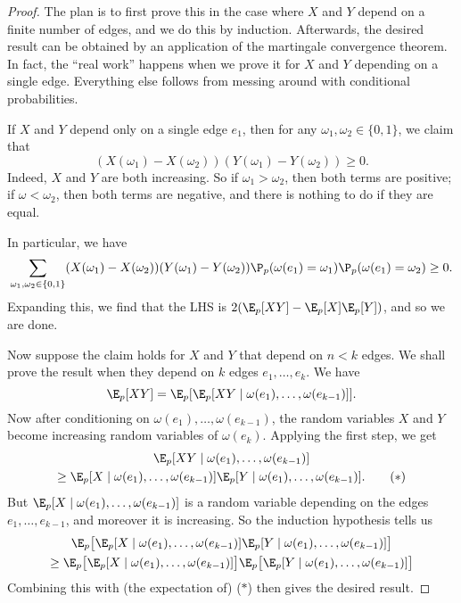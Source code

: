 \documentclass[a4paper]{article}
\begin{document}
\begin{proof}
  The plan is to first prove this in the case where $X$ and $Y$ depend on a finite number of edges, and we do this by induction. Afterwards, the desired result can be obtained by an application of the martingale convergence theorem. In fact, the ``real work'' happens when we prove it for $X$ and $Y$ depending on a single edge. Everything else follows from messing around with conditional probabilities.

  If $X$ and $Y$ depend only on a single edge $e_1$, then for any $\omega_1, \omega_2 \in \{0, 1\}$, we claim that
  \[
    (X(\omega_1) - X(\omega_2))(Y(\omega_1) - Y(\omega_2)) \geq 0.
  \]
  Indeed, $X$ and $Y$ are both increasing. So if $\omega_1 > \omega_2$, then both terms are positive; if $\omega < \omega_2$, then both terms are negative, and there is nothing to do if they are equal.

  In particular, we have
  \[
    \sum_{\omega_1, \omega_2 \in \{0, 1\}} (X(\omega_1) - X(\omega_2)) (Y(\omega_1) - Y(\omega_2)) \P_p( \omega(e_1) = \omega_1) \P_p(\omega(e_1) = \omega_2) \geq 0.
  \]
  Expanding this, we find that the LHS is $2(\E_p[XY] - \E_p[X] \E_p[Y])$, and so we are done.

  Now suppose the claim holds for $X$ and $Y$ that depend on $n < k$ edges. We shall prove the result when they depend on $k$ edges $e_1, \ldots, e_k$. We have
  \[
    \E_p[XY] = \E_p[\E_p[XY \mid \omega(e_1), \ldots, \omega(e_{k - 1})]].
  \]
  Now after conditioning on $\omega(e_1), \ldots, \omega(e_{k - 1})$, the random variables $X$ and $Y$ become increasing random variables of $\omega(e_k)$. Applying the first step, we get
  \begin{multline*}
    \E_p[X Y \mid \omega(e_1), \ldots, \omega(e_{k - 1})]\\
    \geq \E_p[X \mid \omega(e_1), \ldots, \omega(e_{k - 1})] \E_p[Y \mid \omega(e_1), \ldots, \omega(e_{k - 1})].\tag{$*$}
  \end{multline*}
  But $\E_p[X \mid \omega(e_1), \ldots, \omega(e_{k - 1})]$ is a random variable depending on the edges $e_1, \ldots, e_{k - 1}$, and moreover it is increasing. So the induction hypothesis tells us
  \begin{multline*}
    \E_p\big[\E_p[X \mid \omega(e_1), \ldots, \omega(e_{k - 1})] \E_p[Y \mid \omega(e_1), \ldots, \omega(e_{k - 1})]\big] \\
    \geq \E_p\big[\E_p[X \mid \omega(e_1), \ldots, \omega(e_{k - 1})]\big] \E_p\big[\E_p[Y \mid \omega(e_1), \ldots, \omega(e_{k - 1})]\big]
  \end{multline*}
  Combining this with (the expectation of) ($*$) then gives the desired result.


\end{proof}
\end{document}
